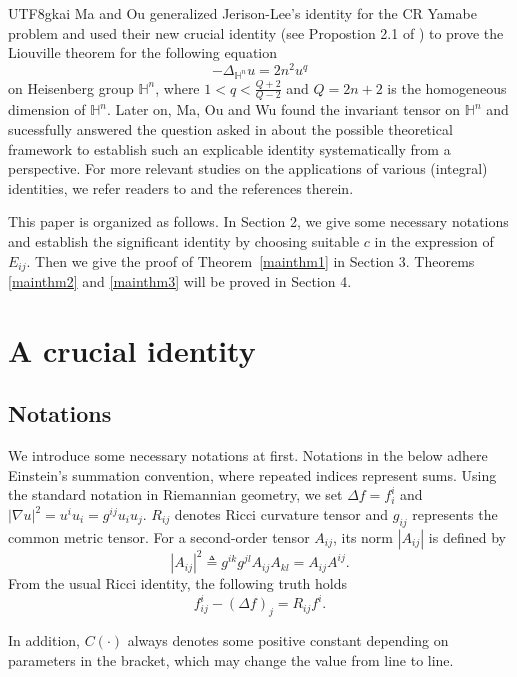 \documentclass[reqno,12pt]{amsart}
\numberwithin{equation}{section}
\newcommand{\thmref}[1]{Theorem~\ref{#1}}
\begin{document}
\begin{CJK}{UTF8}{gkai}
		  	  Ma and Ou \cite{MO1} generalized Jerison-Lee's identity \cite{JL1} for the CR Yamabe problem and used their new crucial identity (see Propostion 2.1 of \cite{MO1}) to prove the Liouville theorem for the following equation 
		  	  \begin{equation*}
		  	  	 -\Delta_{\mathbb{H}^{n}}u=2n^{2}u^{q}
		  	  \end{equation*}
		  	  on Heisenberg group $\mathbb{H}^{n}$, where $1<q<\frac{Q+2}{Q-2}$ and $Q=2n+2$ is the homogeneous dimension of $\mathbb{H}^{n}$. Later on, Ma, Ou and Wu \cite{MOW} found the invariant tensor on $\mathbb{H}^{n}$ and sucessfully answered the question asked in \cite{JL1} about the possible theoretical framework to establish such an explicable identity systematically from a perspective. For more relevant studies on the applications of various  (integral) identities, we refer  readers to \cite{CFR,DEL,LM1,LO}  and the references therein.
		  	  
		  	  This paper is organized as follows. In Section 2, we give some necessary notations and establish the significant identity by choosing suitable $c$ in the expression of $E_{ij}$. Then we give the proof of \thmref{mainthm1} in Section 3. Theorems \ref{mainthm2} and \ref{mainthm3} will be proved in Section 4.
\section{ A crucial identity}
\subsection{Notations}
 We introduce some necessary notations at first. Notations in the below adhere Einstein's summation convention, where repeated indices represent sums. Using the standard notation in Riemannian geometry, we  set $\Delta f=f_{i}^{i}$ and $|\nabla u|^{2}=u^{i}u_{i}=g^{ij}u_{i}u_{j}$. $R_{ij}$ denotes  Ricci curvature tensor and $g_{ij}$ represents the common metric tensor. For a second-order tensor $A_{ij}$, its norm $|A_{ij}|$ is defined by $$|A_{ij}|^{2}\triangleq g^{ik}g^{jl}A_{ij}A_{kl}=A_{ij}A^{ij}.$$ From the usual Ricci identity,  the following truth holds
 \begin{equation}\label{Ricci identity}
   f_{ij}^{i}-(\Delta f)_{j}=R_{ij}f^{i}.
 \end{equation}
 
 In addition, $C(\cdot)$ always denotes some positive constant depending on parameters in the bracket, which may change the value from line to line.
 

\end{CJK}
\end{document}
